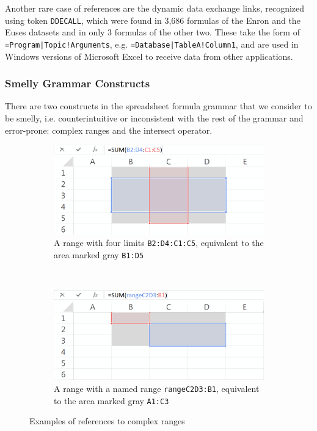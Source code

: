 \documentclass[times]{smrauth}
\begin{document}
Another rare case of references are the dynamic data exchange links, recognized using token \texttt{DDECALL}, which were found in 3,686 formulas of the Enron and the Euses datasets and in only 3 formulas of the other two. These take the form of \texttt{=Program|Topic!Arguments}, e.g. \texttt{=Database|TableA!Column1}, and are used in Windows versions of Microsoft Excel to receive  data from other applications.

\subsubsection{Smelly Grammar Constructs}
There are two constructs in the spreadsheet formula grammar that we consider to be smelly, i.e. counterintuitive or inconsistent with the rest of the grammar and error-prone: complex ranges and the intersect operator.
\begin{figure}
	\centering
	\begin{subfigure}[b]{0.49\textwidth}
		\centering
		\includegraphics[width=1\textwidth]{img/complexRanges}
		\caption{A range with four limits \texttt{B2:D4:C1:C5}, equivalent to the area marked gray \texttt{B1:D5}}
		\label{fig:complexA}
	\end{subfigure}
	~ %
	\begin{subfigure}[b]{0.49\textwidth}
		\centering
		\includegraphics[width=1\textwidth]{img/complexNamedRanges}
		\caption{A range with a named range \texttt{rangeC2D3:B1}, equivalent to the area marked gray \texttt{A1:C3}}
		\label{fig:complexB}
	\end{subfigure}
	\caption{Examples of references to complex ranges}\label{Figure:ComplexRanges}
\end{figure}
\end{document}

